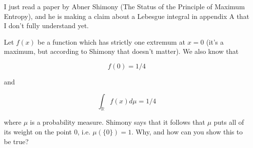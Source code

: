 I just read a paper by Abner Shimony (The Status of the Principle of
Maximum Entropy), and he is making a claim about a Lebesgue integral
in appendix A that I don't fully understand yet.

Let $f(x)$ be a function which has strictly one extremum at $x=0$
(it's a maximum, but according to Shimony that doesn't matter). We
also know that 

$$
f(0)=1/4
$$

and 

$$
\int_{\mathbb{R}}f(x)d\mu=1/4
$$

where $\mu$ is a probability measure. Shimony says that it follows
that $\mu$ puts all of its weight on the point $0$, i.e.
$\mu(\{0\})=1$. Why, and how can you show this to be true?